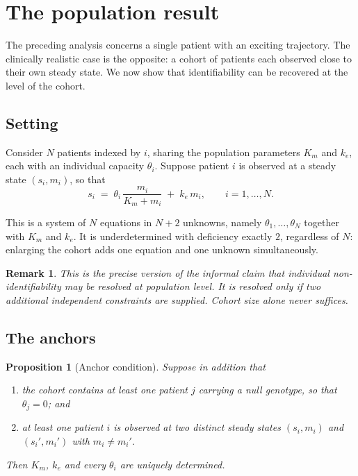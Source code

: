 \documentclass[11pt,a4paper]{article}
\newtheorem{proposition}{Proposition}
\newtheorem{remark}{Remark}
\begin{document}
\section{The population result}

The preceding analysis concerns a single patient with an exciting trajectory. The clinically
realistic case is the opposite: a cohort of patients each observed close to their own steady
state. We now show that identifiability can be recovered at the level of the cohort.

\subsection{Setting}

Consider $N$ patients indexed by $i$, sharing the population parameters $K_m$ and $k_e$,
each with an individual capacity $\theta_i$. Suppose patient $i$ is observed at a steady
state $(s_i, m_i)$, so that
\begin{equation}
s_i \;=\; \theta_i\, \frac{m_i}{K_m + m_i} \;+\; k_e\, m_i,
\qquad i = 1, \dots, N .
\label{eq:pop}
\end{equation}

This is a system of $N$ equations in $N + 2$ unknowns, namely $\theta_1, \dots, \theta_N$
together with $K_m$ and $k_e$. It is underdetermined with deficiency exactly $2$, regardless
of $N$: enlarging the cohort adds one equation and one unknown simultaneously.

\begin{remark}
This is the precise version of the informal claim that individual non-identifiability may be
resolved at population level. It is resolved only if two additional independent constraints
are supplied. Cohort size alone never suffices.
\end{remark}

\subsection{The anchors}

\begin{proposition}[Anchor condition]
\label{prop:anchor}
Suppose in addition that
\begin{enumerate}[label=(\roman*), leftmargin=*, itemsep=1pt]
\item the cohort contains at least one patient $j$ carrying a null genotype, so that
      $\theta_j = 0$; and
\item at least one patient $i$ is observed at two distinct steady states
      $(s_i, m_i)$ and $(s_i', m_i')$ with $m_i \neq m_i'$.
\end{enumerate}
Then $K_m$, $k_e$ and every $\theta_i$ are uniquely determined.
\end{proposition}
\end{document}
